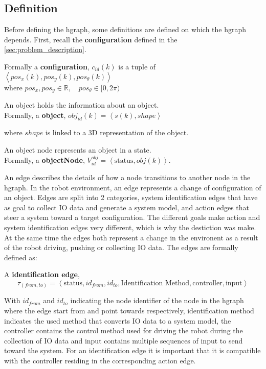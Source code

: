 \subsection{Definition}%
\label{subsec:hgraph_definition}%
Before defining the \ac{hgraph}, some definitions are defined on which the \ac{hgraph} depends. First, recall the \textbf{configuration} defined in the \cref{sec:problem_description}.\bs

Formally a \textbf{configuration}, $c_{id}(k)$ is a tuple of $\left\langle pos_x(k), pos_y(k), pos_\theta(k)\right\rangle$\\ where $pos_x, pos_y \in \mathbb{R}, \quad  pos_\theta \in [0, 2\pi)$\bs

An object holds the information about an object.\\Formally, a \textbf{object},  $obj_{id}(k) = \left\langle s(k), shape \right\rangle $\bs

where $shape$ is linked to a 3D representation of the object.\bs

An object node represents an object in a state.\\Formally, a \textbf{objectNode}, $V^{obj}_{id} =\left\langle \textrm{status}, obj(k)\right\rangle $.\bs

An edge describes the details of how a node transitions to another node in the \ac{hgraph}. In the robot environment, an edge represents a change of configuration of an object. Edges are split into 2 categories, system identification edges that have as goal to collect \ac{IO} data and generate a system model, and action edges that steer a system toward a target configuration. The different goals make action and system identification edges very different, which is why the destiction was make. At the same time the edges both represent a change in the environent as a result of the robot driving, pushing or collecting \ac{IO} data. The edges are formally defined as:\bs

A \textbf{identification edge}, \[\tau_{(from, to)} = \left\langle \textrm{status}, id_{from}, id_{to}, \textrm{Identification Method}, \textrm{controller}, \textrm{input}\right\rangle\]\bs

With $id_{from}$ and $id_{to}$ indicating the node identifier of the node in the \ac{hgraph} where the edge start from and point towards respectively, identification method indicates the used method that converts \ac{IO} data to a system model, the controller contains the control method used for driving the robot during the collection of \ac{IO} data and input contains multiple sequences of input to send toward the system. For an identification edge it is important that it is compatible with the controller residing in the corresponding action edge.\bs

